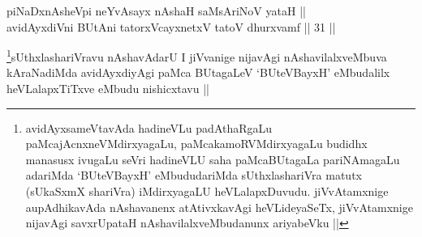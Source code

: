 
\begin{shl}
piNaDxnAsheV\s pi neYvAsayx nAshaH saMsAriNoV yataH || \\
avidAyxdiVni BUtAni tatorxVcayxnetxV tatoV dhurxvamf ||  31 ||  
\end{shl}

\begin{artha}
\footnote[1]{avidAyxsameVtavAda hadineVLu padAthaRgaLu
  paMcajAcnxneVMdirxyagaLu, paMcakamoRVMdirxyagaLu budidhx manasusx
  ivugaLu seVri hadineVLU saha paMcaBUtagaLa pariNAmagaLu adariMda
  `BUteVBayxH' eMbududariMda sUthxlashariVra matutx (sUkaSxmX
  shariVra) iMdirxyagaLU heVLalapxDuvudu. jiVvAtamxnige aupAdhikavAda
  nAshavanenx atAtivxkavAgi heVLideyaSeTx, jiVvAtamxnige nijavAgi
  savxrUpataH nAshavilalxveMbudanunx ariyabeVku ||}sUthxlashariVravu nAshavAdarU I jiVvanige nijavAgi
nAshavilalxveMbuva kAraNadiMda avidAyxdiyAgi paMca BUtagaLeV
`BUteVBayxH' eMbudalilx heVLalapxTiTxve eMbudu nishicxtavu ||
\end{artha}
